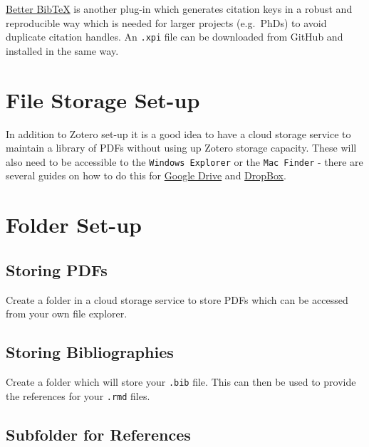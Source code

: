 \documentclass[
]{book}
\begin{document}
\href{https://github.com/retorquere/zotero-better-bibtex/releases/tag/v5.1.76}{Better BibTeX} is another plug-in which generates citation keys in a robust and reproducible way which is needed for larger projects (e.g.~PhDs) to avoid duplicate citation handles. An \texttt{.xpi} file can be downloaded from GitHub and installed in the same way.

\hypertarget{file-storage-set-up}{%
\section{File Storage Set-up}\label{file-storage-set-up}}

In addition to Zotero set-up it is a good idea to have a cloud storage service to maintain a library of PDFs without using up Zotero storage capacity. These will also need to be accessible to the \texttt{Windows\ Explorer} or the \texttt{Mac\ Finder} - there are several guides on how to do this for \href{https://www.howtogeek.com/228989/how-to-use-the-desktop-google-drive-app/}{Google Drive} and \href{https://www.dropboxforum.com/t5/Installation-and-desktop-app/How-do-I-put-Dropbox-on-my-File-Explorer-in-Win-10/td-p/313031}{DropBox}.

\hypertarget{folder-set-up}{%
\section{Folder Set-up}\label{folder-set-up}}

\hypertarget{storing-pdfs}{%
\subsection{Storing PDFs}\label{storing-pdfs}}

Create a folder in a cloud storage service to store PDFs which can be accessed from your own file explorer.

\hypertarget{storing-bibliographies}{%
\subsection{Storing Bibliographies}\label{storing-bibliographies}}

Create a folder which will store your \texttt{.bib} file. This can then be used to provide the references for your \texttt{.rmd} files.

\hypertarget{subfolder-for-references}{%
\subsection{Subfolder for References}\label{subfolder-for-references}}
\end{document}
